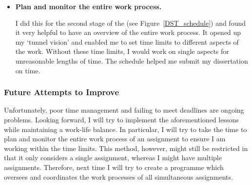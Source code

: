 \begin{itemize}
	\item[\checkmark] \textbf{Plan and monitor the entire work process.}
	
	I did this for the second stage of the \DSTTitle \space (see Figure~\ref{DST_schedule}) and found it very helpful to have an overview of the entire work process.
	It opened up my `tunnel vision' and enabled me to set time limits to different aspects of the work.
	Without these time limits, I would work on single aspects for unreasonable lengths of time.
	The schedule helped me submit my dissertation on time.
	
	
\end{itemize}




\subsubsection*{Future Attempts to Improve}

Unfortunately, poor time management and failing to meet deadlines are ongoing problems.
Looking forward, I will try to implement the aforementioned lessons while maintaining a work-life balance.
In particular, I will try to take the time to plan and monitor the entire work process of an assignment to ensure I am working within the time limits.
This method, however, might still be restricted in that it only considers a single assignment, whereas I might have multiple assignments.
Therefore, next time I will try to create a programme which oversees and coordinates the work processes of all simultaneous assignments.



